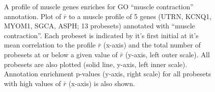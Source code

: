 \documentclass{bioinfo}
\begin{document}
\begin{figure}[!tpb]
\label{figure:muscle_cdf}
\centerline{}
\caption{A profile of muscle genes enriches for GO ``muscle contraction''
annotation.  Plot of $\bar{r}$ to a muscle profile of 5 genes (UTRN, KCNQ1,
MYOM1, SGCA, ASPH; 13 probesets) annotated with ``muscle contraction''.  Each
probeset is indicated by it's first initial at it's mean correlation to the
profile $\bar{r}$ (x-axis) and the total number of probesets at or below a
given value of $\bar{r}$ (y-axis, left outer scale).  All probesets are also
plotted (solid line, y-axis, left inner scale).  Annotation enrichment p-values
(y-axis, right scale) for all probesets with high values of $\bar{r}$ (x-axis)
is also shown.}
\end{figure}

\end{document}

